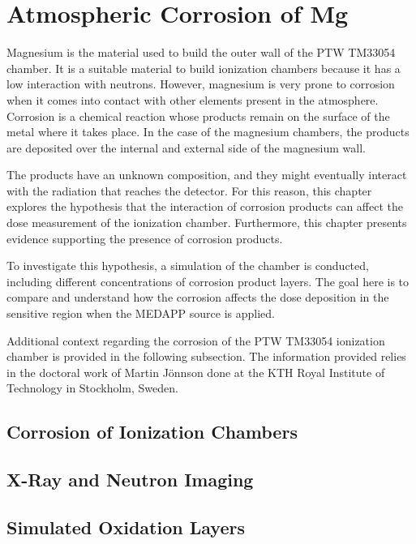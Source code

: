 \chapter{Atmospheric Corrosion of Mg}
Magnesium is the material used to build the outer wall of the PTW TM33054 chamber. It is a suitable material to build ionization chambers because it has a low interaction with neutrons. However, magnesium is very prone to corrosion when it comes into contact with other elements present in the atmosphere. Corrosion is a chemical reaction whose products remain on the surface of the metal where it takes place. In the case of the magnesium chambers, the products are deposited over the internal and external side of the magnesium wall. 

The products have an unknown composition, and they might eventually interact with the radiation that reaches the detector. For this reason, this chapter explores the hypothesis that the interaction of corrosion products can affect the dose measurement of the ionization chamber. Furthermore, this chapter presents evidence supporting the presence of corrosion products.

To investigate this hypothesis, a simulation of the chamber is conducted, including different concentrations of corrosion product layers. The goal here is to compare and understand how the corrosion affects the dose deposition in the sensitive region when the MEDAPP source is applied. 

Additional context regarding the corrosion of the PTW TM33054 ionization chamber is provided in the following subsection. The information provided relies in the doctoral work of Martin Jönnson done at the KTH Royal Institute of Technology in Stockholm, Sweden.

\section{Corrosion of Ionization Chambers}

\section{X-Ray and Neutron Imaging}

\section{Simulated Oxidation Layers}
